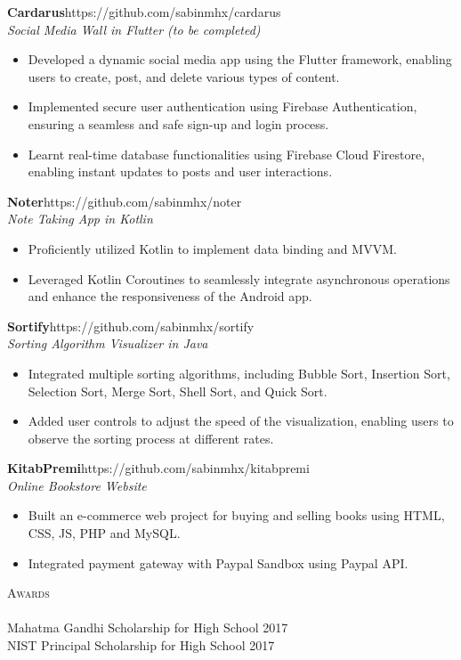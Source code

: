 \documentclass[a4paper]{article}
\newcommand{\lineunder} {
    \vspace*{-8pt} \\
    \hspace*{-18pt} \hrulefill \\
}
\newcommand{\header} [1] {
    {\hspace*{-18pt}\vspace*{6pt} \textsc{#1}}
    \vspace*{-6pt} \lineunder
}
\begin{document}
{\textbf{Cardarus}}\hfill https://github.com/sabinmhx/cardarus\\
\textit{Social Media Wall in Flutter (to be completed)}
\begin{itemize} \itemsep 1pt
	\item Developed a dynamic social media app using the Flutter framework, enabling users to create, post, and delete various types of content.
    \item Implemented secure user authentication using Firebase Authentication, ensuring a seamless and safe sign-up and login process.
    \item Learnt real-time database functionalities using Firebase Cloud Firestore, enabling instant updates to posts and user interactions.
\end{itemize}
\vspace*{2mm}

{\textbf{Noter}}\hfill https://github.com/sabinmhx/noter\\
\textit{Note Taking App in Kotlin}
\begin{itemize} \itemsep 1pt
	\item Proficiently utilized Kotlin to implement data binding and MVVM. 
	\item Leveraged Kotlin Coroutines to seamlessly integrate asynchronous operations and enhance the responsiveness of the Android app.
\end{itemize}
\vspace*{2mm}

{\textbf{Sortify}}\hfill https://github.com/sabinmhx/sortify\\
\textit{Sorting Algorithm Visualizer in Java}
\begin{itemize} \itemsep 1pt
	\item Integrated multiple sorting algorithms, including Bubble Sort, Insertion Sort, Selection Sort, Merge Sort, Shell Sort, and Quick Sort.
	\item Added user controls to adjust the speed of the visualization, enabling users to observe the sorting process at different rates.
\end{itemize}
\vspace*{2mm}


{\textbf{KitabPremi}}\hfill https://github.com/sabinmhx/kitabpremi\\
\textit{Online Bookstore Website}
\begin{itemize} \itemsep 1pt
	\item Built an e-commerce web project for buying and selling books using HTML, CSS, JS, PHP and MySQL.  
	\item Integrated payment gateway with Paypal Sandbox using Paypal API.
\end{itemize}
\vspace*{2mm}

\header{Awards}
{Mahatma Gandhi Scholarship for High School} \hfill 2017\\
\vspace*{2mm}
{NIST Principal Scholarship for High School} \hfill 2017\\
\vspace*{2mm}

\ 
\end{document}
